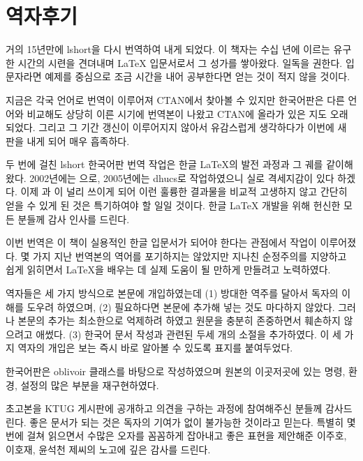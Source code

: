 \chapter*{역자후기}
\markboth{}{}

거의 15년만에 lshort을 다시 번역하여 내게 되었다.
이 책자는 수십 년에 이르는 유구한 시간의 시련을 견뎌내며 \LaTeX{} 입문서로서 
그 성가를 쌓아왔다. 일독을 권한다. 입문자라면 예제를 중심으로 
조금 시간을 내어 공부한다면 얻는 것이 적지 않을 것이다.

지금은 각국 언어로 번역이 이루어져 CTAN에서 찾아볼 수 있지만 
한국어판은 다른 언어와 비교해도 상당히 이른 시기에 번역본이 나왔고 
CTAN에 올라가 있은 지도 오래 되었다. 그리고 그 기간 갱신이 이루어지지 
않아서 유감스럽게 생각하다가 이번에 새 판을 내게 되어 매우 흡족하다.

두 번에 걸친 lshort 한국어판 번역 작업은 한글 \LaTeX 의 발전 과정과 
그 궤를 같이해 왔다. 2002년에는 \HLaTeX 으로, 2005년에는 dhucs로 
작업하였으니 실로 격세지감이 있다 하겠다. 이제 \koTeX 과 \XeLaTeX 이 널리 쓰이게 되어 
이런 훌륭한 결과물을 비교적 고생하지 않고 간단히 얻을 수 있게 된 것은 
특기하여야 할 일일 것이다. 한글 \LaTeX{} 개발을 위해 헌신한 모든 분들께 
감사 인사를 드린다.

이번 번역은 이 책이 실용적인 한글 입문서가 되어야 한다는 관점에서 
작업이 이루어졌다. 몇 가지 지난 번역본의 역어를 포기하지는 않았지만 
지나친 순정주의를 지양하고 쉽게 읽히면서 \LaTeX 을 배우는 데 실제 
도움이 될 만하게 만들려고 노력하였다. 

역자들은 세 가지 방식으로 본문에 개입하였는데 (1) 방대한 역주를 달아서 
독자의 이해를 도우려 하였으며, (2) 필요하다면 본문에 추가해 넣는 것도 마다하지 않았다.
그러나 본문의 추가는 최소한으로 억제하려 하였고 원문을
충분히 존중하면서 훼손하지 않으려고 애썼다. (3) 한국어 문서 
작성과 관련된 두세 개의 소절을 추가하였다. 이 세 가지 역자의 개입은 
보는 즉시 바로 알아볼 수 있도록 표지를 붙여두었다.

한국어판은 \textsf{oblivoir} 클래스를 바탕으로 작성하였으며 
원본의 이곳저곳에 있는 명령, 환경, 설정의 많은 부분을 재구현하였다. 

초고본을 KTUG 게시판에 공개하고 의견을 구하는 과정에 참여해주신 분들께 감사드린다.
좋은 문서가 되는 것은 독자의 기여가 없이 불가능한 것이라고 믿는다. 
특별히 몇 번에 걸쳐 읽으면서 수많은 오자를 꼼꼼하게 잡아내고 좋은 표현을 제안해준
이주호, 이호재, 윤석천 제씨의 노고에 깊은 감사를 드린다.

